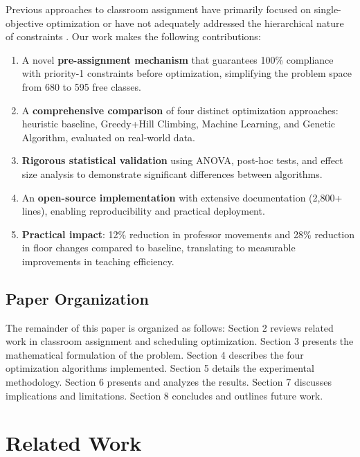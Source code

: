 \documentclass[algorithms,article,submit,pdftex,moreauthors]{Definitions/mdpi}
\begin{document}
Previous approaches to classroom assignment have primarily focused on single-objective optimization or have not adequately addressed the hierarchical nature of constraints \citep{ref-pillay2014}. Our work makes the following contributions:

\begin{enumerate}
\item A novel \textbf{pre-assignment mechanism} that guarantees 100\% compliance with priority-1 constraints before optimization, simplifying the problem space from 680 to 595 free classes.

\item A \textbf{comprehensive comparison} of four distinct optimization approaches: heuristic baseline, Greedy+Hill Climbing, Machine Learning, and Genetic Algorithm, evaluated on real-world data.

\item \textbf{Rigorous statistical validation} using ANOVA, post-hoc tests, and effect size analysis to demonstrate significant differences between algorithms.

\item An \textbf{open-source implementation} with extensive documentation (2,800+ lines), enabling reproducibility and practical deployment.

\item \textbf{Practical impact}: 12\% reduction in professor movements and 28\% reduction in floor changes compared to baseline, translating to measurable improvements in teaching efficiency.
\end{enumerate}

\subsection{Paper Organization}

The remainder of this paper is organized as follows: Section 2 reviews related work in classroom assignment and scheduling optimization. Section 3 presents the mathematical formulation of the problem. Section 4 describes the four optimization algorithms implemented. Section 5 details the experimental methodology. Section 6 presents and analyzes the results. Section 7 discusses implications and limitations. Section 8 concludes and outlines future work.

\section{Related Work}
\end{document}
